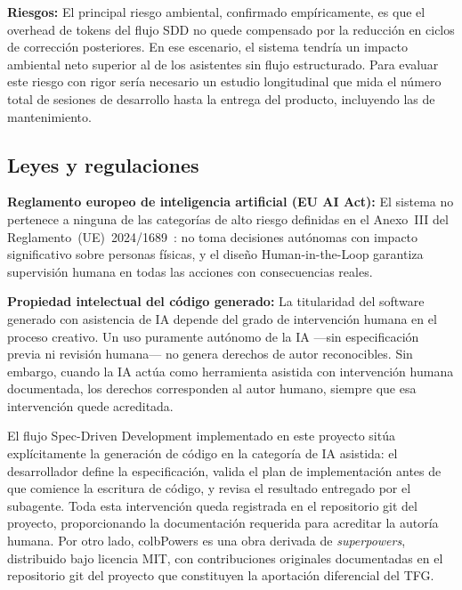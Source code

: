 \documentclass[11pt, letterpaper]{article}
\begin{document}
\textbf{Riesgos:} El principal riesgo ambiental, confirmado empíricamente, es que el overhead de tokens del flujo SDD no quede compensado por la reducción en ciclos de corrección posteriores. En ese escenario, el sistema tendría un impacto ambiental neto superior al de los asistentes sin flujo estructurado. Para evaluar este riesgo con rigor sería necesario un estudio longitudinal que mida el número total de sesiones de desarrollo hasta la entrega del producto, incluyendo las de mantenimiento.

\subsection{Leyes y regulaciones}
\label{sec:leyes_y_regulaciones}

\begin{description}
    \item \textbf{Reglamento europeo de inteligencia artificial (EU AI Act):} El sistema no pertenece a ninguna de las categorías de alto riesgo definidas en el Anexo~III del Reglamento~(UE)~2024/1689~\cite{euaiact2024}: no toma decisiones autónomas con impacto significativo sobre personas físicas, y el diseño Human-in-the-Loop garantiza supervisión humana en todas las acciones con consecuencias reales.

    \item \textbf{Propiedad intelectual del código generado: } La titularidad del software generado con asistencia de IA  depende del grado de intervención humana en el proceso creativo. Un uso puramente autónomo de la IA —sin especificación previa ni revisión humana— no genera derechos de autor reconocibles. Sin embargo, cuando  la IA actúa como herramienta asistida con intervención humana documentada, los derechos corresponden al autor humano, siempre que esa intervención quede acreditada. \cite{medinatamayo2025}

    El flujo Spec-Driven Development implementado en este proyecto sitúa explícitamente la generación de código en la categoría de IA asistida: el desarrollador define la especificación, valida el plan de implementación antes de que comience la escritura de código, y revisa el resultado entregado por el subagente. Toda esta intervención queda registrada en el repositorio git del proyecto, proporcionando la documentación requerida para acreditar la autoría humana. Por otro lado, colbPowers es una obra derivada de \textit{superpowers}, distribuido bajo licencia MIT, con contribuciones originales documentadas en el repositorio git del proyecto que constituyen la aportación diferencial del TFG.


\end{description}
\end{document}
